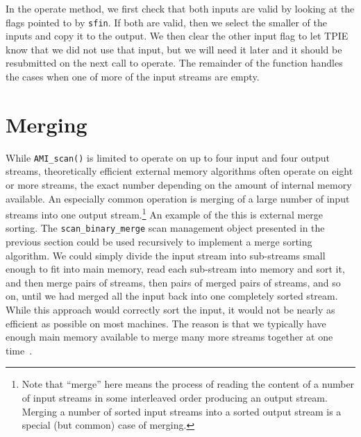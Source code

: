In the operate method, we first check that both inputs are valid by
looking at the flags pointed to by \lstinline|sfin|.  If both are valid,
then we select the smaller of the inputs and copy it to the output.
We then clear the other input flag to let TPIE know that we did not
use that input, but we will need it later and it should be resubmitted
on the next call to operate. The remainder of the function handles
the cases when one of more of the input streams are empty.


\section{Merging} 

While \lstinline|AMI_scan()| is limited to operate on up to
four input and four output streams, theoretically efficient
external memory algorithms often operate on eight or more
streams, the exact number depending on the amount of
internal memory available. An especially common operation is
merging of a large number of input streams into one output
stream.\footnote{Note that ``merge'' here means the process
   of reading the content of a number of input streams in
   some interleaved order producing an output stream.
   Merging a number of sorted input streams into a sorted
   output stream is a special (but common) case of
   merging.} An example of the this is external merge
sorting. The \lstinline|scan_binary_merge| scan management
object presented in the previous section could be used
recursively to implement a merge sorting algorithm. We could simply divide the
input stream into sub-streams small enough to fit into main
memory, read each sub-stream into memory and sort it, and
then merge pairs of streams, then pairs of merged pairs of
streams, and so on, until we had merged all the input back
into one completely sorted stream. While this approach would
correctly sort the input, it would not be nearly as
efficient as possible on most machines. The reason is that
we typically have enough main memory available to merge many
more streams together at one time~\cite{aggarwal:input}.

